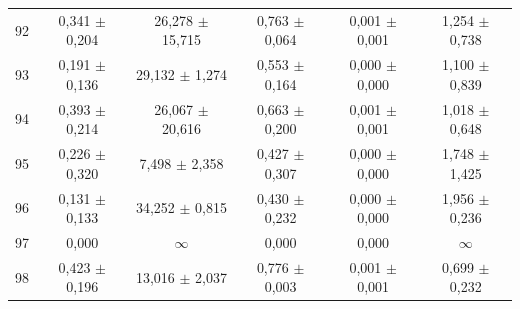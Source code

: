 \begin{tabular}{l c c c c c}
92 & 0,341 $\pm$ 0,204 & 26,278 $\pm$ 15,715 & 0,763 $\pm$ 0,064 & 0,001 $\pm$ 0,001 & 1,254 $\pm$ 0,738 \\
93 & 0,191 $\pm$ 0,136 & 29,132 $\pm$ 1,274 & 0,553 $\pm$ 0,164 & 0,000 $\pm$ 0,000 & 1,100 $\pm$ 0,839 \\
94 & 0,393 $\pm$ 0,214 & 26,067 $\pm$ 20,616 & 0,663 $\pm$ 0,200 & 0,001 $\pm$ 0,001 & 1,018 $\pm$ 0,648 \\
95 & 0,226 $\pm$ 0,320 & 7,498 $\pm$ 2,358 & 0,427 $\pm$ 0,307 & 0,000 $\pm$ 0,000 & 1,748 $\pm$ 1,425 \\
96 & 0,131 $\pm$ 0,133 & 34,252 $\pm$ 0,815 & 0,430 $\pm$ 0,232 & 0,000 $\pm$ 0,000 & 1,956 $\pm$ 0,236 \\
97 & 0,000 & $\infty$ & 0,000 & 0,000 & $\infty$ \\
98 & 0,423 $\pm$ 0,196 & 13,016 $\pm$ 2,037 & 0,776 $\pm$ 0,003 & 0,001 $\pm$ 0,001 & 0,699 $\pm$ 0,232 \\
\hline 
 \end{tabular}
